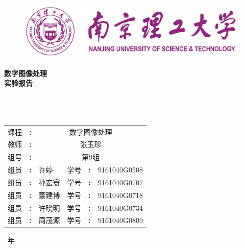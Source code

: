 \documentclass[12pt]{article}
\date{}
\renewcommand\figurename{\heiti\zihao{5} 图}
\renewcommand\tablename{\heiti\zihao{5} 表}
\begin{document}
\captionsetup{labelformat=default,labelsep=space}
\renewcommand{\contentsname}{\centering 目录}
\renewcommand\refname{参考文献}
\renewcommand\appendix{\setcounter{secnumdepth}{0}}
\renewcommand\abstractname{摘要}
\begin{figure}[h]
  \centering
  \includegraphics[width=.6\textwidth]{logo}
\end{figure}
\thispagestyle{empty}
\begin{center}
\begin{songti}
\textbf{数字图像处理}\\
\textbf{实验报告}\\\ \\\
\\ \
\renewcommand\arraystretch{1.5}
\begin{tabular}{p{1.5cm}<{\centering} p{0.2cm}<{\centering} p{3.5cm}<{\centering} p{1.5cm}<{\centering} p{0.2cm}<{\centering} p{3.5cm}<{\centering}}
课程&\textbf{:}&\multicolumn{4}{c}{数字图像处理}\\\cline{3-6}
教师&\textbf{:}&\multicolumn{4}{c}{张玉珍}\\\cline{3-6}
组号&\textbf{:}&\multicolumn{4}{c}{第9组}\\\cline{3-6}
组员&\textbf{:}&许婷&学号&\textbf{:}&9161040G0508\\\cline{3-3}\cline{6-6}
组员&\textbf{:}&孙宏寰&学号&\textbf{:}&9161040G0707\\\cline{3-3}\cline{6-6}
组员&\textbf{:}&董建博&学号&\textbf{:}&9161040G0718\\\cline{3-3}\cline{6-6}
组员&\textbf{:}&许晓明&学号&\textbf{:}&9161040G0734\\\cline{3-3}\cline{6-6}
组员&\textbf{:}&周茂源 &学号&\textbf{:}&9161040G0809\\\cline{3-3}\cline{6-6}
\end{tabular}

\begin{table}[b]
  \centering
\number\year\ 年\ \number{}
\end{table}

\end{songti}
\end{center}
\begin{center}
\newpage
{}
\newpage
\setcounter{page}{1}
\tableofcontents
\newpage
\setcounter{page}{1}

\end{center}
\end{document}
